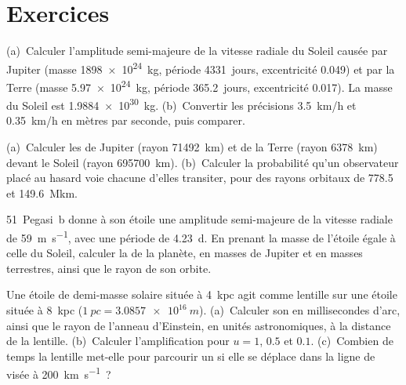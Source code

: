 \section{Exercices}

\begin{exercise}[$\star$]\label{exo:b3:exoplanets:1}
(a)~Calculer l'amplitude semi-majeure de la vitesse radiale du Soleil causée par
Jupiter (masse \qty{1898e24}{kg}, période \num{4331}~jours, excentricité
0.049) et par la Terre (masse \qty{5.97e24}{kg}, période \num{365.2}~jours,
excentricité 0.017). La masse du Soleil est \qty{1.9884e30}{kg}.
(b)~Convertir les précisions \qty{3.5}{km/h} et \qty{0.35}{km/h} en
mètres par seconde, puis comparer.
\end{exercise}

\begin{exercise}[$\star$]\label{exo:b3:exoplanets:2}
(a)~Calculer les  de Jupiter (rayon \qty{71492}{km}) et de
la Terre (rayon \qty{6378}{km}) devant le Soleil (rayon
\qty{695700}{km}). (b)~Calculer la probabilité qu'un observateur placé au hasard
voie chacune d'elles transiter, pour des rayons orbitaux de \num{778.5}
et \qty{149.6}{\mega km}.
\end{exercise}

\begin{exercise}[$\star$]\label{exo:b3:exoplanets:3}
51~Pegasi~b donne à son étoile une amplitude semi-majeure de la vitesse radiale de
\qty{59}{m.s^{-1}}, avec une période de \qty{4.23}{d}. En prenant la masse de
l'étoile égale à celle du Soleil, calculer la  de la planète, en
masses de Jupiter et en masses terrestres, ainsi que le rayon de son orbite.
\end{exercise}

\begin{exercise}[$\star$]\label{exo:b3:exoplanets:4}
Une étoile de demi-masse solaire située à \qty{4}{kpc} agit comme lentille sur une
étoile située à \qty{8}{kpc} ($\qty{1}{pc} = \qty{3.0857e16}{m}$). (a)~Calculer
son  en millisecondes d'arc, ainsi que le rayon de l'anneau
d'Einstein, en unités astronomiques, à la distance de la lentille. (b)~Calculer
l'amplification pour $u = 1$, $0.5$ et $0.1$. (c)~Combien de temps la lentille
met-elle pour parcourir un  si elle se déplace dans la ligne de
visée à \qty{200}{km.s^{-1}}~?
\end{exercise}

